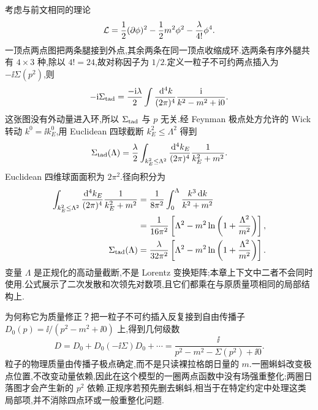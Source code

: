 考虑与前文相同的理论
\begin{equation}
 \mathcal L=\frac12(\partial\phi)^2-\frac12m^2\phi^2-\frac\lambda{4!}\phi^4.
\end{equation}
一顶点两点图把两条腿接到外点,其余两条在同一顶点收缩成环.选两条有序外腿共有 $4\times3$ 种,除以 $4!=24$,故对称因子为 $1/2$.定义一粒子不可约两点插入为 $-\ii\Sigma(p^2)$,则
\begin{equation}
 -\mathrm i\Sigma_{\rm tad}
 =\frac{-\mathrm i\lambda}{2}\int\frac{\,\mathrm d^4k}{(2\pi)^4}\frac{\mathrm i}{k^2-m^2+\mathrm i0}.
\end{equation}
这张图没有外动量进入环,所以 $\Sigma_{\rm tad}$ 与 $p$ 无关.经 Feynman 极点处方允许的 Wick 转动 $k^0=\ii k_E^0$,用 Euclidean 四球截断 $k_E^2\leq\Lambda^2$ 得到
\begin{equation}
 \Sigma_{\rm tad}(\Lambda)=\frac\lambda2
 \int_{k_E^2\leq\Lambda^2}\frac{\,\mathrm d^4k_E}{(2\pi)^4}\frac1{k_E^2+m^2}.
\end{equation}
Euclidean 四维球面面积为 $2\pi^2$.径向积分为
\begin{align}
 \int_{k_E^2\leq\Lambda^2}\frac{\,\mathrm d^4k_E}{(2\pi)^4}\frac1{k_E^2+m^2}
 &=\frac1{8\pi^2}\int_0^\Lambda\frac{k^3\,\mathrm d k}{k^2+m^2}\\
 &=\frac1{16\pi^2}\left[\Lambda^2-m^2\ln\left(1+\frac{\Lambda^2}{m^2}\right)\right],\\
 \Sigma_{\rm tad}(\Lambda)&=\frac\lambda{32\pi^2}
 \left[\Lambda^2-m^2\ln\left(1+\frac{\Lambda^2}{m^2}\right)\right].
 \label{eq:tadpole-cutoff}
\end{align}
变量 $\Lambda$ 是正规化的高动量截断,不是 Lorentz 变换矩阵;本章上下文中二者不会同时使用.公式展示了二次发散和次领先对数项,且它们都乘在与原质量项相同的局部结构上.

为何称它为质量修正？把一粒子不可约插入反复接到自由传播子 $D_0(p)=\ii/(p^2-m^2+\ii0)$ 上,得到几何级数
\begin{equation}
 D=D_0+D_0(-\ii\Sigma)D_0+\cdots
 =\frac{\ii}{p^2-m^2-\Sigma(p^2)+\ii0}.
 \label{eq:dyson-scalar}
\end{equation}
粒子的物理质量由传播子极点确定,而不是只读裸拉格朗日量的 $m$.一圈蝌蚪改变极点位置,不改变动量依赖,因此在这个模型的一圈两点函数中没有场强重整化;两圈日落图才会产生新的 $p^2$ 依赖.正规序若预先删去蝌蚪,相当于在特定约定中处理这类局部项,并不消除四点环或一般重整化问题.


